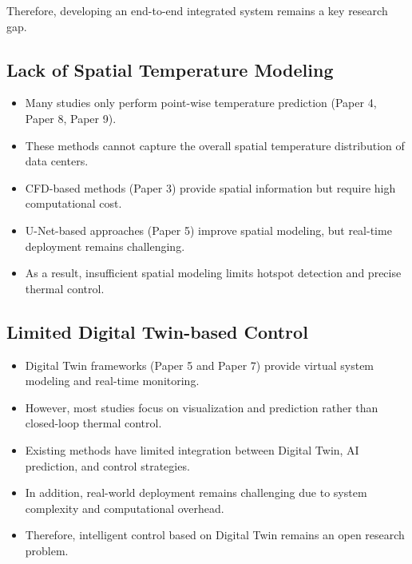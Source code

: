 \documentclass[12pt,a4paper]{article}
\begin{document}
                Therefore, developing an end-to-end integrated system remains a key research gap.
    
    \subsection{Lack of Spatial Temperature Modeling}
                \begin{itemize}
                \item Many studies only perform point-wise temperature prediction (Paper 4, Paper 8, Paper 9).
                
                \item These methods cannot capture the overall spatial temperature distribution of data centers.
                
                \item CFD-based methods (Paper 3) provide spatial information but require high computational cost.
                
                \item U-Net-based approaches (Paper 5) improve spatial modeling, but real-time deployment remains challenging.
                
                \item As a result, insufficient spatial modeling limits hotspot detection and precise thermal control.
                \end{itemize}
                
    \subsection{Limited Digital Twin-based Control}
                \begin{itemize}
                \item Digital Twin frameworks (Paper 5 and Paper 7) provide virtual system modeling and real-time monitoring.
                
                \item However, most studies focus on visualization and prediction rather than closed-loop thermal control.
                
                \item Existing methods have limited integration between Digital Twin, AI prediction, and control strategies.
                
                \item In addition, real-world deployment remains challenging due to system complexity and computational overhead.
                
                \item Therefore, intelligent control based on Digital Twin remains an open research problem.
            \end{itemize}
            
\end{document}

